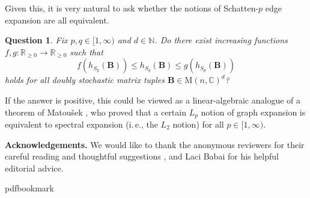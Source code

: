 \documentclass[11pt]{article}
\newtheorem{question}[theorem]{Question}
\newcommand{\R}{{\mathbb R}}
\newcommand{\N}{{\mathbb N}}
\newcommand{\ie}{i.\,e.}
\renewcommand{\paragraph}[1]{\vspace{6pt} \noindent \textbf{#1}\xspace}
\theoremstyle{plain}
\numberwithin{equation}{section}
\theoremstyle{definition}
\newcommand{\bC}{\mathbb{C}}
\newcommand{\M}{\mathrm{M}}
\newcommand{\tuple}[1]{\mathbf{#1}}
\newcommand{\vB}{\tuple{B}}
\begin{document}
Given this, it is very natural to ask whether the notions of Schatten-$p$ edge expansion are all equivalent.
\begin{question}
    Fix $p,q \in [1,\infty)$ and $d \in \N$. Do there exist increasing functions $f,g:\R_{\geq 0} \to \R_{\geq 0}$ such that
    \[
        f(h_{S_p}(\vB)) \leq h_{S_q}(\vB) \leq g(h_{S_p}(\vB))
    \]
    holds for all doubly stochastic matrix tuples $\vB \in \M(n,\bC)^d$?
\end{question}
If the answer is positive, this could be viewed as a linear-algebraic analogue of a theorem of Matou\v sek \cite{Matousek97}, who proved that a certain $L_p$ notion of graph expansion is equivalent to spectral expansion (\ie, the $L_2$ notion) for all $p \in [1,\infty)$.

\paragraph{Acknowledgements.} We would like to %
thank  %
the anonymous reviewers for their careful reading and thoughtful suggestions%
, and Laci Babai for his helpful editorial advice. 

\newcommand{\prelim}{Preliminary version in\ }\newcommand{\prelims}{Preliminary
  versions in\ }
\providecommand{\bibhead}[1]{}
\expandafter\ifx\csname pdfbookmark\endcsname\relax%
  \providecommand{\tocrefpdfbookmark}{}
\else\providecommand{\tocrefpdfbookmark}{%
   \hypertarget{tocreferences}{}%
   \pdfbookmark[1]{References}{tocreferences}}%
\fi
\end{document}
